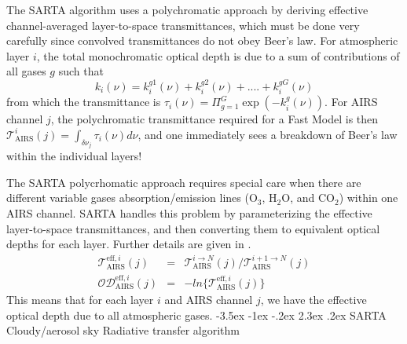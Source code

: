 \documentclass[11pt]{article}
\makeatletter
\newcommand{\sa}{\textsf{SARTA}\xspace}
\newcommand{\cd}{CO$_2$\xspace}
\newcommand{\water}{H$_2$O\xspace}
\newcommand{\ozone}{O$_3$\xspace}
\renewcommand{\section}{\@startsection {section}{1}{\z@}%
                                   {-3.5ex \@plus -1ex \@minus -.2ex}%
                                   {2.3ex \@plus.2ex}%
                                   {\reset@font\large\bfseries}}
\makeatother
\begin{document}
The \sa algorithm uses a polychromatic approach by deriving effective
channel-averaged layer-to-space transmittances, which must be done
very carefully since convolved transmittances do not obey Beer's law.
For atmospheric layer $i$, the total monochromatic optical depth is
due to a sum of contributions of all gases $g$ such that
\[
k_i(\nu) = k_i^{g1}(\nu) + k_i^{g2}(\nu) + .... + k_i^{gG}(\nu)
\]
from which the transmittance is $\tau_{i}(\nu) = \Pi_{g=1}^G
\exp(-k_i^{g}(\nu))$. For AIRS channel $j$, the polychromatic
transmittance required for a Fast Model is then
$\mathcal{T}_{\text{AIRS}}^{i}(j) = \int_{\delta \nu_{j}}
\tau_{i}(\nu) d\nu$, and one immediately sees a breakdown of Beer's
law within the individual layers!


The \sa polycrhomatic approach requires special care when there are
different variable gases absorption/emission lines (\ozone, \water,
and \cd) within one \textsf{AIRS} channel. \sa handles this problem by
parameterizing the effective layer-to-space transmittances, and then
converting them to equivalent optical depths for each layer. Further
details are given in \cite{han:02*1,str:02*2}.
\begin{eqnarray*}
  \mathcal{T}^{\text{eff},i}_{\text{AIRS}}(j) & = & \mathcal{T}_{\text{AIRS}}^{i \rightarrow N}(j) / \mathcal{T}_{\text{AIRS}}^{i+1 \rightarrow N}(j) \\
  \mathcal{OD}^{\text{eff},i}_{\text{AIRS}}(j) & = & -ln\{\mathcal{T}^{\text{eff},i}_{\text{AIRS}}(j) \}
\end{eqnarray*}
This means that for each layer $i$ and AIRS channel $j$, we have the
effective optical depth due to all atmospheric gases.
\section{SARTA Cloudy/aerosol sky Radiative transfer algorithm}
\end{document}
